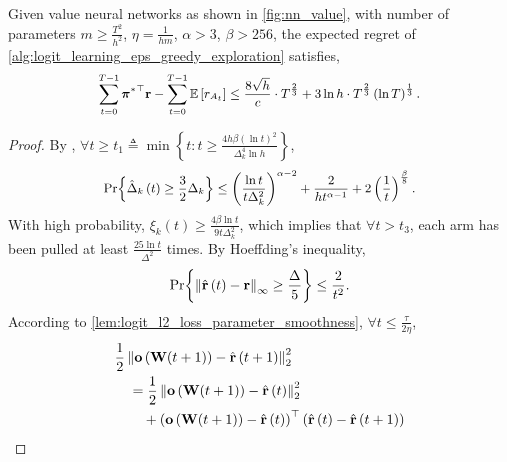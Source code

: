 \begin{thm}
	\label{thm:logit_learning_main_result}
	Given value neural networks as shown in \cref{fig:nn_value}, with number of parameters $m \ge \frac{T^2}{h^2}$, $\eta = \frac{1}{h m}$, $\alpha > 3$, $\beta > 256$, the expected regret of \cref{alg:logit_learning_eps_greedy_exploration} satisfies,
	\begin{equation*}
	\small
	\begin{split}
	\sum\limits_{t=0}^{T-1}{ {\rvpi^*}^\top \rvr } - \sum\limits_{t=0}^{T-1}{ \sE \left[ r_{A_t} \right] } \le \frac{8 \sqrt{h}}{c} \cdot T^{\frac{2}{3}} + 3 \ln{h} \cdot T^{\frac{2}{3}} \left(\ln{T}\right)^{\frac{1}{3}}.
	\end{split}
	\end{equation*}
\end{thm}
\begin{proof}
	By \citep{seldin2017improved},
	$\forall t \ge t_1 \triangleq \min{\left\{ t : t \ge \frac{4 h \beta \left(\ln{t}\right)^2}{\Delta_k^4 \ln{h}} \right\}}$,
	\begin{equation*}
	\small
	\begin{split}
	\pr{\left\{ \hat{\Delta}_k\left(t\right) \ge \frac{3}{2} \Delta_k \right\}} \le \left( \frac{\ln{t}}{t \Delta_k^2} \right)^{\alpha - 2} + \frac{2}{h t^{\alpha - 1}} + 2 \left(\frac{1}{t}\right)^{\frac{\beta}{8}}.
	\end{split}
	\end{equation*}
	With high probability, $\xi_k\left(t\right) \ge \frac{4 \beta \ln{t}}{9 t \Delta_k^2}$, which implies that $\forall t > t_3$,  each arm has been pulled at least $\frac{25\ln{t}}{\Delta^2}$ times. By Hoeffding's inequality,
	\begin{equation*}
	\begin{split}
	{\text{Pr}}{\left\{ \left\| \hat{{\mathbf{r}}}\left(t\right) - {\mathbf{r}}\right\|_\infty \ge \frac{\Delta}{5} \right\}} \le \frac{2}{t^2}.
	\end{split}
	\end{equation*}
	According to \cref{lem:logit_l2_loss_parameter_smoothness}, $\forall t \le \frac{\tau}{2 \eta}$,
	\begin{equation*}
	\begin{split}
	&\frac{1}{2} \left\| \rvo\left( \rmW(t+1) \right) - \hat{\rvr}\left(t+1\right)\right\|_2^2 \\
	&\quad = \frac{1}{2} \left\| \rvo\left( \rmW(t+1) \right) - \hat{\rvr}\left(t\right)\right\|_2^2 \\
	&\qquad + \left( \rvo\left( \rmW(t+1) \right) - \hat{\rvr}\left(t\right) \right)^\top \left( \hat{\rvr}\left(t\right) - \hat{\rvr}\left(t+1\right) \right) \\

\end{split}
\end{equation*}
\end{proof}
